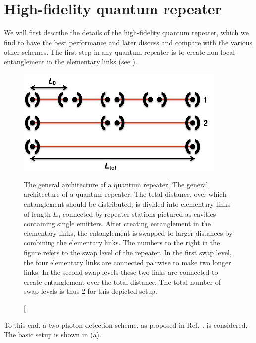 \section{High-fidelity quantum repeater}  \label{sec:generation}

We will first describe the details of the high-fidelity quantum repeater, which
we find to have the best performance and later discuss and compare with the
various other schemes. The first step in any quantum repeater is to create
non-local entanglement in the elementary links (see ).
\begin{figure} 
\centering
\includegraphics[width=4.0in]{./figs_Borregaard_PRA2015/figure1}
\caption
[The general architecture of a quantum repeater]
{The general architecture of a quantum repeater. The total distance,
over which entanglement should be distributed, is divided into elementary links
of length $L_{0}$ connected by repeater stations pictured as cavities containing
single emitters. After creating entanglement in the elementary links, the
entanglement is swapped to larger distances by combining the elementary links.
The numbers to the right in the figure refers to the swap level of the repeater.
In the first swap level, the four elementary links are connected pairwise to
make two longer links. In the second swap levels these two links are connected
to create entanglement over the total distance. The total number of swap levels
is thus 2 for this depicted setup. }
\label{fig:figure1}
\end{figure} 
To this end, a two-photon detection scheme, as proposed in Ref.~\cite{kimble2},
is considered. The basic setup is shown in (a).
